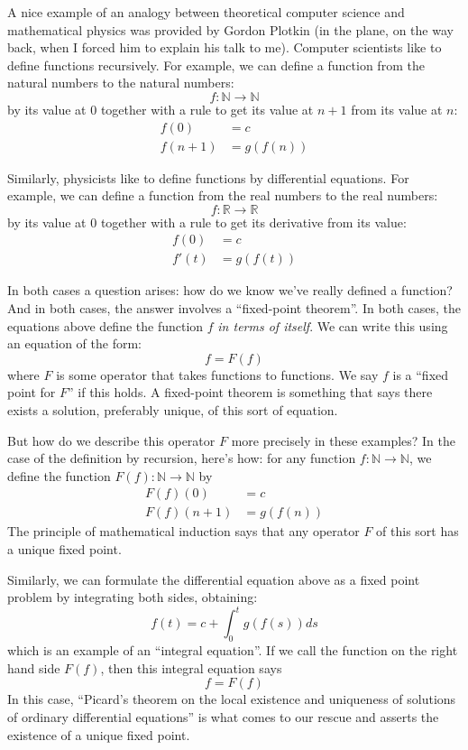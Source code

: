 \documentclass{article}
\begin{document}
A nice example of an analogy between theoretical computer science and
mathematical physics was provided by Gordon Plotkin (in the plane, on
the way back, when I forced him to explain his talk to me). Computer
scientists like to define functions recursively. For example, we can
define a function from the natural numbers to the natural numbers:
\[f\colon\mathbb{N}\to\mathbb{N}\] by its value at \(0\) together with a
rule to get its value at \(n+1\) from its value at \(n\): \[
  \begin{aligned}
    f(0) &= c
  \\f(n+1) &= g(f(n))
  \end{aligned}
\]

Similarly, physicists like to define functions by differential
equations. For example, we can define a function from the real numbers
to the real numbers: \[f\colon\mathbb{R}\to\mathbb{R}\] by its value at
\(0\) together with a rule to get its derivative from its value: \[
  \begin{aligned}
    f(0) &= c
  \\f'(t) &= g(f(t))
  \end{aligned}
\]

In both cases a question arises: how do we know we've really defined a
function? And in both cases, the answer involves a ``fixed-point
theorem''. In both cases, the equations above define the function \(f\)
\emph{in terms of itself}. We can write this using an equation of the
form: \[f = F(f)\] where \(F\) is some operator that takes functions to
functions. We say \(f\) is a ``fixed point for \(F\)'' if this holds. A
fixed-point theorem is something that says there exists a solution,
preferably unique, of this sort of equation.

But how do we describe this operator \(F\) more precisely in these
examples? In the case of the definition by recursion, here's how: for
any function \(f\colon\mathbb{N}\to\mathbb{N}\), we define the function
\(F(f)\colon\mathbb{N}\to\mathbb{N}\) by \[
  \begin{aligned}
    F(f)(0) &= c
  \\F(f)(n+1) &= g(f(n))
  \end{aligned}
\] The principle of mathematical induction says that any operator \(F\)
of this sort has a unique fixed point.

Similarly, we can formulate the differential equation above as a fixed
point problem by integrating both sides, obtaining:
\[f(t) = c + \int_0^t g(f(s)) ds\] which is an example of an ``integral
equation''. If we call the function on the right hand side \(F(f)\),
then this integral equation says \[f = F(f)\] In this case, ``Picard's
theorem on the local existence and uniqueness of solutions of ordinary
differential equations'' is what comes to our rescue and asserts the
existence of a unique fixed point.
\end{document}
